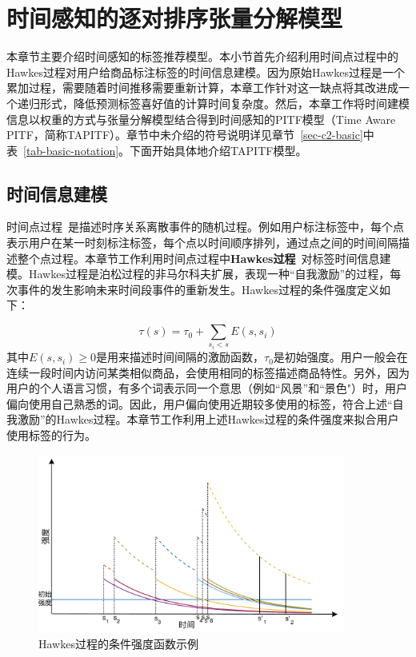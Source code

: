 \section{时间感知的逐对排序张量分解模型}
\label{sec-wpitf-wpitf}
本章节主要介绍时间感知的标签推荐模型。本小节首先介绍利用时间点过程中的Hawkes过程对用户给商品标注标签的时间信息建模。因为原始Hawkes过程是一个累加过程，需要随着时间推移需要重新计算，本章工作针对这一缺点将其改进成一个递归形式，降低预测标签喜好值的计算时间复杂度。然后，本章工作将时间建模信息以权重的方式与张量分解模型结合得到时间感知的PITF模型（Time Aware PITF，简称TAPITF）。章节中未介绍的符号说明详见章节~\ref{sec-c2-basic}中表~\ref{tab-basic-notation}。下面开始具体地介绍TAPITF模型。

\subsection{时间信息建模}
\label{sec-wpitf-time}
时间点过程~\cite{schoenberg2010introduction}是描述时序关系离散事件的随机过程。例如用户标注标签中，每个点表示用户在某一时刻标注标签，每个点以时间顺序排列，通过点之间的时间间隔描述整个点过程。本章节工作利用时间点过程中\textbf{Hawkes过程}~\cite{hawkes1971spectra}对标签时间信息建模。Hawkes过程是泊松过程的非马尔科夫扩展，表现一种``自我激励''的过程，每次事件的发生影响未来时间段事件的重新发生。Hawkes过程的条件强度定义如下：

\begin{equation}
\label{equ-wpitf-hawkes}
\tau(s) = \tau_0 + \sum_{s_i<s}E(s,s_i)
\end{equation}
其中$E(s,s_i)\geq 0$是用来描述时间间隔的激励函数，$\tau_0$是初始强度。用户一般会在连续一段时间内访问某类相似商品，会使用相同的标签描述商品特性。另外，因为用户的个人语言习惯，有多个词表示同一个意思（例如``风景''和``景色"）时，用户偏向使用自己熟悉的词。因此，用户偏向使用近期较多使用的标签，符合上述``自我激励''的Hawkes过程。本章节工作利用上述Hawkes过程的条件强度来拟合用户使用标签的行为。

\begin{figure}
	\centering
	\includegraphics[width=0.9\textwidth]{Fig/wpitf/tagHawkes}
	\caption{Hawkes过程的条件强度函数示例}
	\label{fig-wpitf-tagHawkes}
\end{figure}

